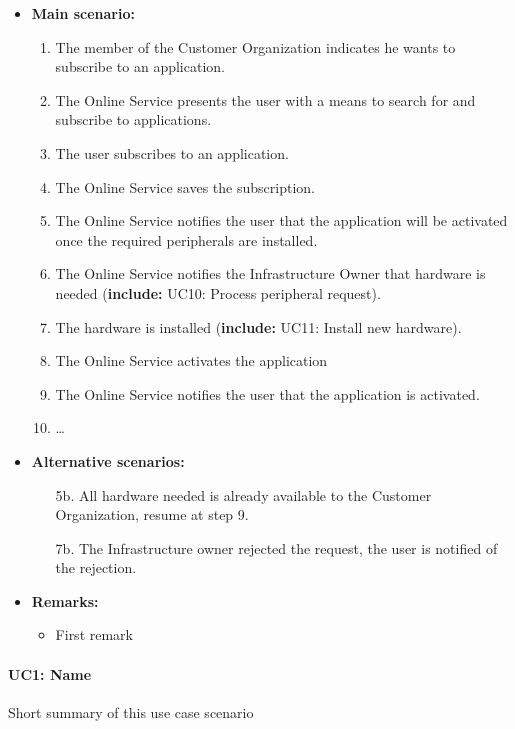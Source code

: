 \documentclass[english,peerreview]{sareport}
\begin{document}
\begin{itemize}
    \item \textbf{Main scenario:} 
    \begin{enumerate}
       \item The member of the Customer Organization indicates he wants to subscribe to an application.
       \item The Online Service presents the user with a means to search for and subscribe to applications.
       \item The user subscribes to an application.
	\item The Online Service saves the subscription.
	\item The Online Service notifies the user that the application will be activated once the required peripherals are installed.
	\item The Online Service notifies the Infrastructure Owner that hardware is needed (\textbf{include:} UC10: Process peripheral request).
	\item The hardware is installed (\textbf{include:} UC11: Install new hardware).
	\item The Online Service activates the application
	\item The Online Service notifies the user that the application is activated.
       \item \ldots
    \end{enumerate}

    \item \textbf{Alternative scenarios:} 
    \begin{enumerate}
	\item [5b.] All hardware needed is already available to the Customer Organization, resume at step 9.
        \item [7b.] The Infrastructure owner rejected the request, the user is notified of the rejection.
    \end{enumerate}
    
    \item \textbf{Remarks:}
        \begin{itemize}
            \item First remark
        \end{itemize}
\end{itemize}

\paragraph{UC1: Name}
Short summary of this use case scenario
\end{document}
